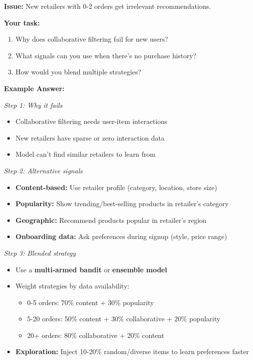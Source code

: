 \documentclass[11pt,letterpaper]{article}
\begin{document}
\textbf{Issue:} New retailers with 0-2 orders get irrelevant recommendations.

\textbf{Your task:}
\begin{enumerate}
    \item Why does collaborative filtering fail for new users?
    \item What signals can you use when there's no purchase history?
    \item How would you blend multiple strategies?
\end{enumerate}

\textbf{Example Answer:}

\textit{Step 1: Why it fails}
\begin{itemize}
    \item Collaborative filtering needs user-item interactions
    \item New retailers have sparse or zero interaction data
    \item Model can't find similar retailers to learn from
\end{itemize}

\textit{Step 2: Alternative signals}
\begin{itemize}
    \item \textbf{Content-based:} Use retailer profile (category, location, store size)
    \item \textbf{Popularity:} Show trending/best-selling products in retailer's category
    \item \textbf{Geographic:} Recommend products popular in retailer's region
    \item \textbf{Onboarding data:} Ask preferences during signup (style, price range)
\end{itemize}

\textit{Step 3: Blended strategy}
\begin{itemize}
    \item Use a \textbf{multi-armed bandit} or \textbf{ensemble model}
    \item Weight strategies by data availability:
    \begin{itemize}
        \item 0-5 orders: 70\% content + 30\% popularity
        \item 5-20 orders: 50\% content + 30\% collaborative + 20\% popularity
        \item 20+ orders: 80\% collaborative + 20\% content
    \end{itemize}
    \item \textbf{Exploration:} Inject 10-20\% random/diverse items to learn preferences faster
\end{itemize}
\end{document}
